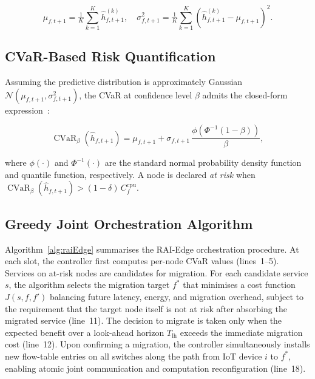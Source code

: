\documentclass[conference]{IEEEtran}
\DeclareMathOperator{\CVaR}{CVaR}
\begin{document}
\begin{equation}
  \mu_{f,t+1} = \tfrac{1}{K}\sum_{k=1}^{K}\hat{h}_{f,t+1}^{(k)},
  \quad
  \sigma_{f,t+1}^2 = \tfrac{1}{K}\sum_{k=1}^{K}
    \!\left(\hat{h}_{f,t+1}^{(k)} - \mu_{f,t+1}\right)^{\!2}.
  \label{eq:mc_moments}
\end{equation}

\subsection{CVaR-Based Risk Quantification}

Assuming the predictive distribution is approximately Gaussian
$\mathcal{N}(\mu_{f,t+1}, \sigma_{f,t+1}^2)$, the CVaR at
confidence level $\beta$ admits the closed-form
expression~\cite{rockafellar2000optimization}:

\begin{equation}
  \CVaR_{\beta}\!\left(\hat{h}_{f,t+1}\right) =
    \mu_{f,t+1} +
    \sigma_{f,t+1}\,\frac{\phi\!\left(\Phi^{-1}(1-\beta)\right)}{\beta},
  \label{eq:cvar}
\end{equation}

where $\phi(\cdot)$ and $\Phi^{-1}(\cdot)$ are the standard normal
probability density function and quantile function, respectively.
A node is declared \emph{at risk} when
$\CVaR_{\beta}(\hat{h}_{f,t+1}) > (1-\delta)\,C_f^{\mathrm{cpu}}$.

\subsection{Greedy Joint Orchestration Algorithm}

Algorithm~\ref{alg:raiEdge} summarises the RAI-Edge orchestration
procedure. At each slot, the controller first computes per-node CVaR
values (lines~1--5). Services on at-risk nodes are candidates for
migration. For each candidate service $s$, the algorithm selects the
migration target $f^*$ that minimises a cost function $J(s,f,f')$
balancing future latency, energy, and migration overhead, subject to
the requirement that the target node itself is not at risk after
absorbing the migrated service (line~11). The decision to migrate is
taken only when the expected benefit over a look-ahead horizon
$T_{\mathrm{lh}}$ exceeds the immediate migration cost (line~12).
Upon confirming a migration, the controller simultaneously installs
new flow-table entries on all switches along the path from IoT device
$i$ to $f^*$, enabling atomic joint communication and computation
reconfiguration (line~18).
\end{document}
